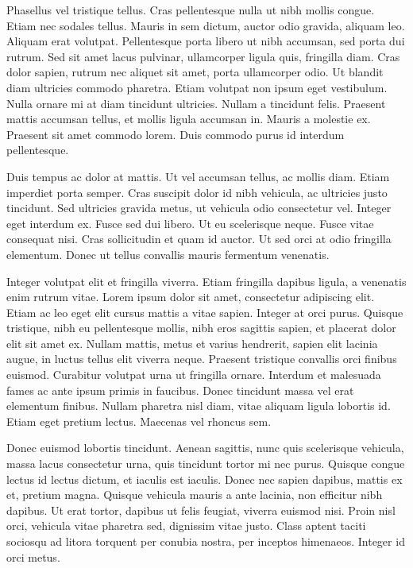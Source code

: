 \documentclass{homework}
\begin{document}
Phasellus vel tristique tellus. Cras pellentesque nulla ut nibh mollis congue. Etiam nec sodales tellus. Mauris in sem dictum, auctor odio gravida, aliquam leo. Aliquam erat volutpat. Pellentesque porta libero ut nibh accumsan, sed porta dui rutrum. Sed sit amet lacus pulvinar, ullamcorper ligula quis, fringilla diam. Cras dolor sapien, rutrum nec aliquet sit amet, porta ullamcorper odio. Ut blandit diam ultricies commodo pharetra. Etiam volutpat non ipsum eget vestibulum. Nulla ornare mi at diam tincidunt ultricies. Nullam a tincidunt felis. Praesent mattis accumsan tellus, et mollis ligula accumsan in. Mauris a molestie ex. Praesent sit amet commodo lorem. Duis commodo purus id interdum pellentesque.

Duis tempus ac dolor at mattis. Ut vel accumsan tellus, ac mollis diam. Etiam imperdiet porta semper. Cras suscipit dolor id nibh vehicula, ac ultricies justo tincidunt. Sed ultricies gravida metus, ut vehicula odio consectetur vel. Integer eget interdum ex. Fusce sed dui libero. Ut eu scelerisque neque. Fusce vitae consequat nisi. Cras sollicitudin et quam id auctor. Ut sed orci at odio fringilla elementum. Donec ut tellus convallis mauris fermentum venenatis.

Integer volutpat elit et fringilla viverra. Etiam fringilla dapibus ligula, a venenatis enim rutrum vitae. Lorem ipsum dolor sit amet, consectetur adipiscing elit. Etiam ac leo eget elit cursus mattis a vitae sapien. Integer at orci purus. Quisque tristique, nibh eu pellentesque mollis, nibh eros sagittis sapien, et placerat dolor elit sit amet ex. Nullam mattis, metus et varius hendrerit, sapien elit lacinia augue, in luctus tellus elit viverra neque. Praesent tristique convallis orci finibus euismod. Curabitur volutpat urna ut fringilla ornare. Interdum et malesuada fames ac ante ipsum primis in faucibus. Donec tincidunt massa vel erat elementum finibus. Nullam pharetra nisl diam, vitae aliquam ligula lobortis id. Etiam eget pretium lectus. Maecenas vel rhoncus sem.

Donec euismod lobortis tincidunt. Aenean sagittis, nunc quis scelerisque vehicula, massa lacus consectetur urna, quis tincidunt tortor mi nec purus. Quisque congue lectus id lectus dictum, et iaculis est iaculis. Donec nec sapien dapibus, mattis ex et, pretium magna. Quisque vehicula mauris a ante lacinia, non efficitur nibh dapibus. Ut erat tortor, dapibus ut felis feugiat, viverra euismod nisi. Proin nisl orci, vehicula vitae pharetra sed, dignissim vitae justo. Class aptent taciti sociosqu ad litora torquent per conubia nostra, per inceptos himenaeos. Integer id orci metus.
\end{document}
